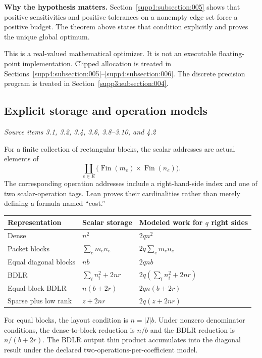 \textbf{Why the hypothesis matters.} Section~\ref{supp1:subsection:005} shows that positive sensitivities and positive tolerances on a nonempty edge set force a positive budget. The theorem above states that condition explicitly and proves the unique global optimum.

This is a real-valued mathematical optimizer. It is not an executable floating-point implementation. Clipped allocation is treated in Sections~\ref{supp4:subsection:005}--\ref{supp4:subsection:006}. The discrete precision program is treated in Section~\ref{supp3:subsection:004}.



\subsection{Explicit storage and operation models}\label{supp2:subsection:005}\textit{Source items 3.1, 3.2, 3.4, 3.6, 3.8--3.10, and 4.2}\par
For a finite collection of rectangular blocks, the scalar addresses are actual elements of
\[
\coprod_{e\in E}\bigl(\operatorname{Fin}(m_e)\times\operatorname{Fin}(n_e)\bigr).
\]
The corresponding operation addresses include a right-hand-side index and one of two scalar-operation tags. Lean proves their cardinalities rather than merely defining a formula named ``cost.''

\begin{center}\small
\renewcommand{\arraystretch}{1.3}
\begin{tabular}{@{}lll@{}}
\toprule
Representation & Scalar storage & Modeled work for $q$ right sides\\
\midrule
Dense & $n^2$ & $2qn^2$\\
Packet blocks & $\sum_em_en_e$ & $2q\sum_em_en_e$\\
Equal diagonal blocks & $nb$ & $2qnb$\\
BDLR & $\sum_i n_i^2+2nr$ & $2q(\sum_i n_i^2+2nr)$\\
Equal-block BDLR & $n(b+2r)$ & $2qn(b+2r)$\\
Sparse plus low rank & $z+2nr$ & $2q(z+2nr)$\\
\bottomrule
\end{tabular}
\end{center}
For equal blocks, the layout condition is $n=|I|b$. Under nonzero denominator conditions, the dense-to-block reduction is $n/b$ and the BDLR reduction is $n/(b+2r)$. The BDLR output thin product accumulates into the diagonal result under the declared two-operations-per-coefficient model.

